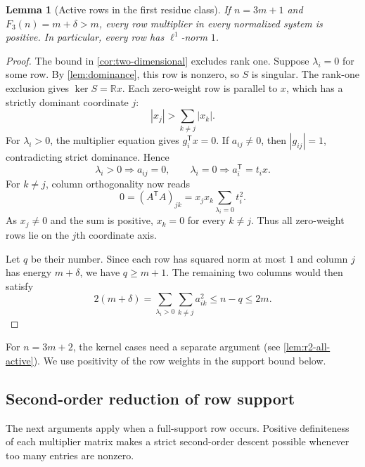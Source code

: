 \documentclass[11pt]{article}
\numberwithin{equation}{section}
\newtheorem{lemma}[lemma]{Lemma}
\theoremstyle{definition}
\theoremstyle{definition}
\newcommand{\R}{\mathbb R}
\newcommand{\F}{F_3}
\begin{document}
\begin{lemma}[Active rows in the first residue class]\label{lem:active-r1}
If $n=3m+1$ and $\F(n)=m+\delta>m$, every row multiplier in every
normalized system is positive. In particular, every row has
$\ell^1$-norm $1$.
\end{lemma}
\begin{proof}
The bound in \cref{cor:two-dimensional} excludes rank one.
Suppose $\lambda_i=0$ for some row. By \cref{lem:dominance}, this
row is nonzero, so $S$ is singular. The rank-one exclusion gives
$\ker S=\R x$. Each zero-weight row is parallel to $x$, which has
a strictly dominant coordinate $j$:
\[
 |x_j|>\sum_{k\ne j}|x_k|.
\]
For $\lambda_i>0$, the multiplier equation gives
$g_i^{\mathsf T}x=0$. If $a_{ij}\ne0$, then $|g_{ij}|=1$, contradicting
strict dominance. Hence
\[
 \lambda_i>0\Longrightarrow a_{ij}=0,\qquad
 \lambda_i=0\Longrightarrow a_i^{\mathsf T}=t_i x.
\]
For $k\ne j$, column orthogonality now reads
\[
 0=(A^{\mathsf T}A)_{jk}
   =x_jx_k\sum_{\lambda_i=0}t_i^2.
\]
As $x_j\ne0$ and the sum is positive, $x_k=0$ for every $k\ne j$.
Thus all zero-weight rows lie on the $j$th coordinate axis.

Let $q$ be their number. Since each row has squared norm at most $1$
and column $j$ has energy $m+\delta$, we have $q\ge m+1$.
The remaining two columns would then satisfy
\[
 2(m+\delta)
 =\sum_{\lambda_i>0}\sum_{k\ne j}a_{ik}^2
 \le n-q\le2m.
\]
\end{proof}

For $n=3m+2$, the kernel cases need a separate argument
(see \cref{lem:r2-all-active}).  We use positivity of the row weights
in the support bound below.

\subsection{Second-order reduction of row support}
The next arguments apply when a full-support row occurs.
Positive definiteness of each multiplier matrix makes a strict
second-order descent possible whenever too many entries are nonzero.
\end{document}
